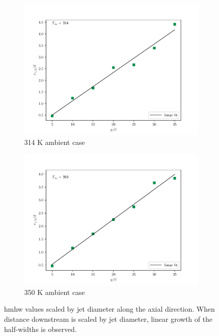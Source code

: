 \begin{figure}[H]
\begin{center}
\begin{subfigure}{0.45\textwidth}
	\includegraphics[scale=.45]{figures/Plots/radial/slices_5/314_ambient/r12_d_vs_x_d.pdf}
	\caption{314 K ambient case} \label{noniso_uin_u0_x_c_1}
\end{subfigure}
\begin{subfigure}{0.45\textwidth}
	\includegraphics[scale=.45]{figures/Plots/radial/slices_5/350_ambient/r12_d_vs_x_d.pdf}
	\caption{350 K ambient case} \label{noniso_uin_u0_x_d_2}
\end{subfigure}
\caption{\gls{hmhw} values scaled by jet diameter along the axial direction. When distance downstream is scaled by jet diameter, linear growth of the half-widths is observed.}
\label{noniso_r12_d_x_d_features}
\end{center}
\end{figure}

